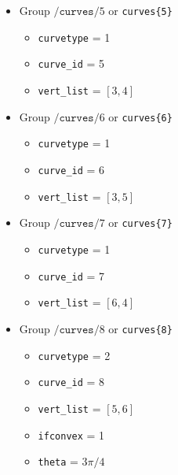 \documentclass[11pt]{article}
\theoremstyle{definition}
\theoremstyle{remark}
\numberwithin{equation}{section}
\begin{document}
\begin{itemize}
\item Group $/\texttt{curves}/5$ or \texttt{curves\{5\}}
\begin{itemize}
\item \texttt{curvetype} = 1
\item \texttt{curve\_id} = 5
\item \texttt{vert\_list} = $[3,4]$
\end{itemize}

\item Group $/\texttt{curves}/6$ or \texttt{curves\{6\}}
\begin{itemize}
\item \texttt{curvetype} = 1
\item \texttt{curve\_id} = 6
\item \texttt{vert\_list} = $[3,5]$
\end{itemize}

\item Group $/\texttt{curves}/7$ or \texttt{curves\{7\}}
\begin{itemize}
\item \texttt{curvetype} = 1
\item \texttt{curve\_id} = 7
\item \texttt{vert\_list} = $[6,4]$
\end{itemize}

\item Group $/\texttt{curves}/8$ or \texttt{curves\{8\}}
\begin{itemize}
\item \texttt{curvetype} = 2
\item \texttt{curve\_id} = 8
\item \texttt{vert\_list} = $[5,6]$
\item \texttt{ifconvex} = 1
\item \texttt{theta} = $3\pi/4$
\end{itemize}
\end{itemize}
\end{document}
